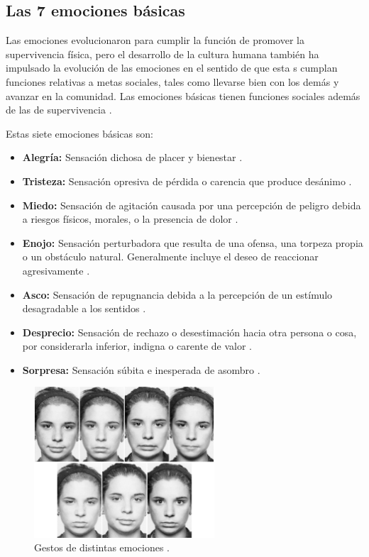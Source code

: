\subsection*{Las 7 emociones básicas}
Las emociones evolucionaron para cumplir la función de promover la supervivencia física, pero el desarrollo de la cultura humana también ha impulsado la evolución de las emociones en el sentido de que esta
s cumplan funciones relativas a metas sociales, tales como llevarse bien con los demás y avanzar en la comunidad. Las emociones básicas tienen funciones sociales además de las de supervivencia \cite{rulicki2012cnv}.

Estas siete emociones básicas son:
\begin{itemize}
\item \textbf{Alegría:} Sensación dichosa de placer y bienestar \cite{rulicki2012cnv}.
\item \textbf{Tristeza:} Sensación opresiva de pérdida o carencia que produce desánimo \cite{rulicki2012cnv}.
\item \textbf{Miedo:} Sensación de agitación causada por una percepción de peligro debida a riesgos físicos, morales, o la presencia de dolor \cite{rulicki2012cnv}.
\item \textbf{Enojo:} Sensación perturbadora que resulta de una ofensa, una torpeza propia o un obstáculo natural. Generalmente incluye el deseo de reaccionar agresivamente \cite{rulicki2012cnv}.
\item \textbf{Asco:} Sensación de repugnancia debida a la percepción de un estímulo desagradable a los sentidos \cite{rulicki2012cnv}.
\item \textbf{Desprecio:} Sensación de rechazo o desestimación hacia otra persona o cosa, por considerarla inferior, indigna o carente de valor \cite{rulicki2012cnv}.
\item \textbf{Sorpresa:} Sensación súbita e inesperada de asombro \cite{rulicki2012cnv}.
\end{itemize}

\begin{figure}[h]
    \centering
    \includegraphics[width=0.6\textwidth]{Emociones.png}
    \caption{Gestos de distintas emociones \cite{ekman2017rostro}.}
    \label{fig:mesh1}
\end{figure}


